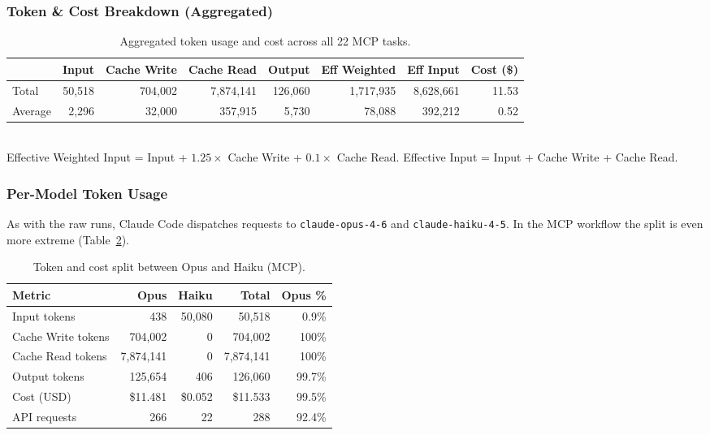 \subsubsection{Token \& Cost Breakdown (Aggregated)}

\begin{table}[h]
\centering
\small
\caption{Aggregated token usage and cost across all 22 MCP tasks.}\label{tab:tokens-agg-mcp}
\setlength{\tabcolsep}{4pt}
\begin{tabular}{lrrrrrrr}
\toprule
& \textbf{Input} & \textbf{Cache Write} & \textbf{Cache Read} & \textbf{Output}
& \textbf{Eff Weighted} & \textbf{Eff Input} & \textbf{Cost (\$)} \\
\midrule
Total   & 50{,}518 & 704{,}002 & 7{,}874{,}141 & 126{,}060 & 1{,}717{,}935 & 8{,}628{,}661 & 11.53 \\
Average & 2{,}296  & 32{,}000  & 357{,}915     &   5{,}730 &    78{,}088   &   392{,}212   &  0.52 \\
\bottomrule
\end{tabular}
\\[4pt]
{\footnotesize
Effective Weighted Input = Input + $1.25 \times$ Cache Write + $0.1 \times$ Cache Read.\quad
Effective Input = Input + Cache Write + Cache Read.}
\end{table}

\subsubsection{Per-Model Token Usage}

As with the raw runs, Claude Code dispatches requests to
\texttt{claude-opus-4-6} and \texttt{claude-haiku-4-5}.
In the MCP workflow the split is even more extreme
(Table~\ref{tab:model-split-mcp}).

\begin{table}[h]
\centering
\caption{Token and cost split between Opus and Haiku (MCP).}\label{tab:model-split-mcp}
\begin{tabular}{lrrrr}
\toprule
\textbf{Metric} & \textbf{Opus} & \textbf{Haiku} & \textbf{Total} & \textbf{Opus \%} \\
\midrule
Input tokens       &        438 &    50{,}080 &     50{,}518 &   0.9\% \\
Cache Write tokens &  704{,}002 &          0 &    704{,}002 & 100\%   \\
Cache Read tokens  & 7{,}874{,}141 &       0 & 7{,}874{,}141 & 100\%   \\
Output tokens      &  125{,}654 &        406 &    126{,}060 &  99.7\% \\
Cost (USD)         &   \$11.481 &    \$0.052 &     \$11.533 &  99.5\% \\
API requests       &        266 &         22 &         288 &  92.4\% \\
\bottomrule
\end{tabular}
\end{table}


